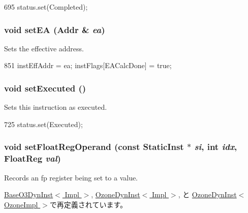 \begin{DoxyCode}
695 { status.set(Completed); }
\end{DoxyCode}
\hypertarget{classBaseDynInst_addd147868ea9ed46b5c943b0eaa57544}{
\subsubsection[{setEA}]{\setlength{\rightskip}{0pt plus 5cm}void setEA ({\bf Addr} \& {\em ea})}}
\label{classBaseDynInst_addd147868ea9ed46b5c943b0eaa57544}
Sets the effective address. 


\begin{DoxyCode}
851 { instEffAddr = ea; instFlags[EACalcDone] = true; }
\end{DoxyCode}
\hypertarget{classBaseDynInst_a22145fd061c0a41a9b7d3c8b499269a9}{
\subsubsection[{setExecuted}]{\setlength{\rightskip}{0pt plus 5cm}void setExecuted ()}}
\label{classBaseDynInst_a22145fd061c0a41a9b7d3c8b499269a9}
Sets this instruction as executed. 


\begin{DoxyCode}
725 { status.set(Executed); }
\end{DoxyCode}
\hypertarget{classBaseDynInst_addc8b4b6511725bf8ff48bd09ef22892}{
\subsubsection[{setFloatRegOperand}]{\setlength{\rightskip}{0pt plus 5cm}void setFloatRegOperand (const {\bf StaticInst} $\ast$ {\em si}, \/  int {\em idx}, \/  {\bf FloatReg} {\em val})}}
\label{classBaseDynInst_addc8b4b6511725bf8ff48bd09ef22892}
Records an fp register being set to a value. 

\hyperlink{classBaseO3DynInst_addc8b4b6511725bf8ff48bd09ef22892}{BaseO3DynInst$<$ Impl $>$}, \hyperlink{classOzoneDynInst_addc8b4b6511725bf8ff48bd09ef22892}{OzoneDynInst$<$ Impl $>$}, と \hyperlink{classOzoneDynInst_addc8b4b6511725bf8ff48bd09ef22892}{OzoneDynInst$<$ OzoneImpl $>$}で再定義されています。


